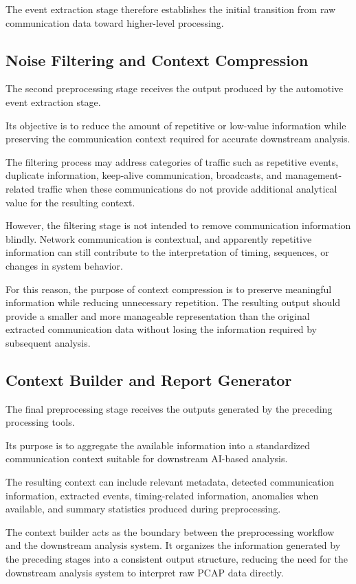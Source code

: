 The event extraction stage therefore establishes the initial transition from raw communication data toward higher-level processing.

\subsection{Noise Filtering and Context Compression}

The second preprocessing stage receives the output produced by the automotive event extraction stage.

Its objective is to reduce the amount of repetitive or low-value information while preserving the communication context required for accurate downstream analysis.

The filtering process may address categories of traffic such as repetitive events, duplicate information, keep-alive communication, broadcasts, and management-related traffic when these communications do not provide additional analytical value for the resulting context.

However, the filtering stage is not intended to remove communication information blindly. Network communication is contextual, and apparently repetitive information can still contribute to the interpretation of timing, sequences, or changes in system behavior.

For this reason, the purpose of context compression is to preserve meaningful information while reducing unnecessary repetition. The resulting output should provide a smaller and more manageable representation than the original extracted communication data without losing the information required by subsequent analysis.

\subsection{Context Builder and Report Generator}

The final preprocessing stage receives the outputs generated by the preceding processing tools.

Its purpose is to aggregate the available information into a standardized communication context suitable for downstream AI-based analysis.

The resulting context can include relevant metadata, detected communication information, extracted events, timing-related information, anomalies when available, and summary statistics produced during preprocessing.

The context builder acts as the boundary between the preprocessing workflow and the downstream analysis system. It organizes the information generated by the preceding stages into a consistent output structure, reducing the need for the downstream analysis system to interpret raw PCAP data directly.

